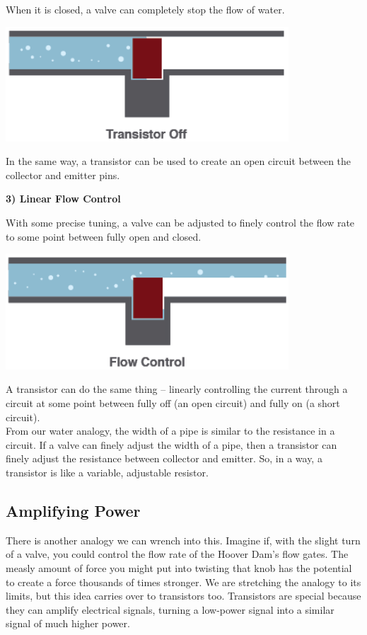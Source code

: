 \documentclass[a4paper, 11pt]{article} %
\begin{document}
When it is closed, a valve can completely stop the flow of water.

\begin{center}
\includegraphics[width=300pt]{tran8}
\end{center}

In the same way, a transistor can be used to create an open circuit between the collector and emitter pins.

\textbf{3) Linear Flow Control}

With some precise tuning, a valve can be adjusted to finely control the flow rate to some point between fully open and closed.

\begin{center}
\includegraphics[width=300pt]{tran9}
\end{center}

A transistor can do the same thing – linearly controlling the current through a circuit at some point between fully off (an open circuit) and fully on (a short circuit).\\

From our water analogy, the width of a pipe is similar to the resistance in a circuit. If a valve can finely adjust the width of a pipe, then a transistor can finely adjust the resistance between collector and emitter. So, in a way, a transistor is like a variable, adjustable resistor.

\subsection*{Amplifying Power}

There is another analogy we can wrench into this. Imagine if, with the slight turn of a valve, you could control the flow rate of the Hoover Dam's flow gates. The measly amount of force you might put into twisting that knob has the potential to create a force thousands of times stronger. We are stretching the analogy to its limits, but this idea carries over to transistors too. Transistors are special because they can amplify electrical signals, turning a low-power signal into a similar signal of much higher power.\\
\end{document}
